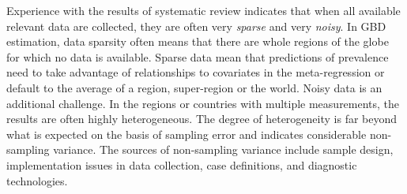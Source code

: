 Experience with the results of systematic review indicates that when
all available relevant data are collected, they are often very
\emph{sparse} and very \emph{noisy}.  In GBD estimation, data sparsity
often means that there are whole regions of the globe for which no
data is available.  Sparse data mean that predictions of prevalence
need to take advantage of relationships to covariates in the
meta-regression or default to the average of a region, super-region or
the world.  Noisy data is an additional challenge. In the regions or
countries with multiple measurements, the results are often highly
heterogeneous. The degree of heterogeneity is far beyond what is
expected on the basis of sampling error and indicates considerable
non-sampling variance.  The sources of non-sampling variance include
sample design, implementation issues in data collection, case
definitions, and diagnostic technologies.

